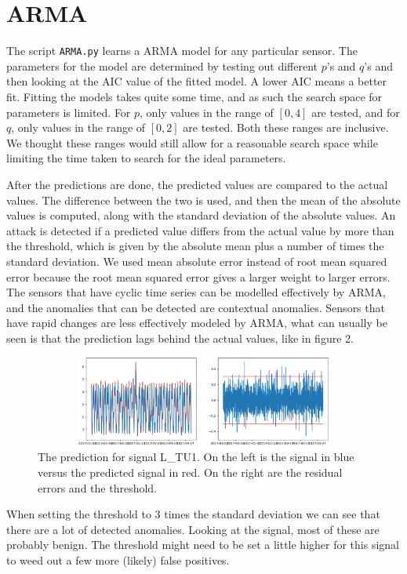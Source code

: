 \documentclass[]{article}
\begin{document}
\clearpage
\section{ARMA}
The script \texttt{ARMA.py} learns a ARMA model for any particular sensor. The parameters for the model are determined by testing out different $p$'s and $q$'s and then looking at the AIC value of the fitted model. A lower AIC means a better fit. Fitting the models takes quite some time, and as such the search space for parameters is limited. For $p$, only values in the range of $[0, 4]$ are tested, and for $q$, only values in the range of $[0, 2]$ are tested. Both these ranges are inclusive. We thought these ranges would still allow for a reasonable search space while limiting the time taken to search for the ideal parameters.

After the predictions are done, the predicted values are compared to the actual values. The difference between the two is used, and then the mean of the absolute values is computed, along with the standard deviation of the absolute values. An attack is detected if a predicted value differs from the actual value by more than the threshold, which is given by the absolute mean plus a number of times the standard deviation. We used mean absolute error instead of root mean squared error because the root mean squared error gives a larger weight to larger errors. The sensors that have cyclic time series can be modelled effectively by ARMA, and the anomalies that can be detected are contextual anomalies. Sensors that have rapid changes are less effectively modeled by ARMA, what can usually be seen is that the prediction lags behind the actual values, like in figure 2. 
\begin{center}
\begin{figure}[H]
  \includegraphics[width=16cm, height=3cm]{./visuallizations/arma_3stddev_LTU1.png}
  \caption{The prediction for signal L\_TU1. On the left is the signal in blue versus the predicted signal in red. On the right are the residual errors and the threshold.}
  \label{signals}
\end{figure}
\end{center}
When setting the threshold to 3 times the standard deviation we can see that there are a lot of detected anomalies. Looking at the signal, most of these are probably benign. The threshold might need to be set a little higher for this signal to weed out a few more (likely) false positives.
\end{document}
